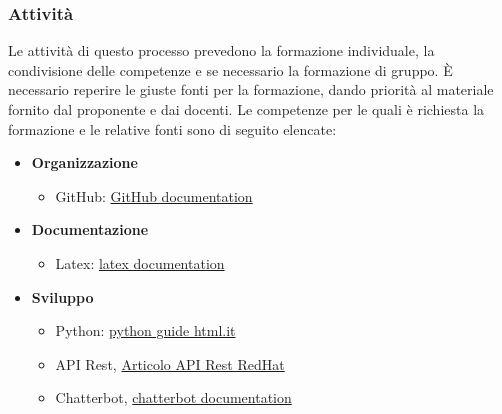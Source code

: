 \subsubsection{Attività}
Le attività di questo processo prevedono la formazione individuale, la condivisione delle competenze e se necessario la formazione di gruppo. È necessario reperire le giuste fonti per la formazione, dando priorità al materiale fornito dal proponente e dai docenti. Le competenze per le quali è richiesta la formazione e le relative fonti sono di seguito elencate:
\begin{itemize}
	\item \textbf{Organizzazione}
		\begin{itemize}		
			\item GitHub: \href{https://docs.github.com/en}{GitHub documentation}
		\end{itemize}
	\item \textbf{Documentazione}
		\begin{itemize}
			\item Latex: \href{https://www.latex-project.org/help/}{latex documentation}
		\end{itemize}
	\item \textbf{Sviluppo}
		\begin{itemize}
			\item Python: \href{https://www.html.it/guide/guida-python/}{python guide html.it}
			\item API Rest, \href{https://www.redhat.com/it/topics/api/what-is-a-rest-api}{Articolo API Rest RedHat}
			\item Chatterbot, \href{https://chatterbot.readthedocs.io/en/stable/}{chatterbot documentation}
		\end{itemize}
\end{itemize}